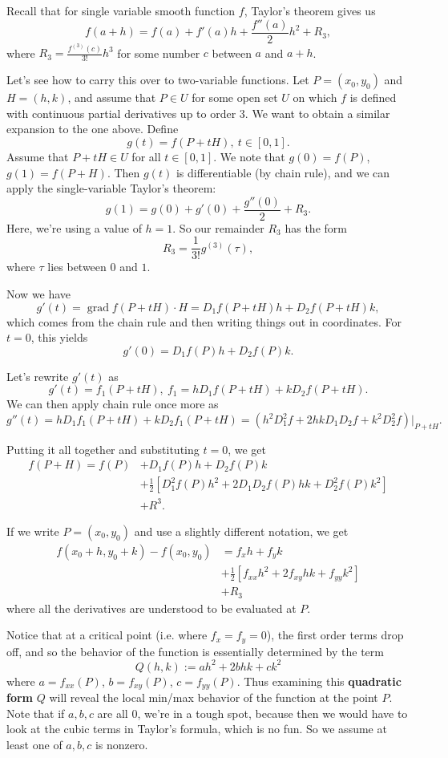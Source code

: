 \documentclass{article}
\DeclareMathOperator{\grd}{grad}
\begin{document}
Recall that for single variable smooth function $f$, Taylor's theorem gives us 
\[f(a+h) = f(a) + f'(a)h + \frac{f''(a)}{2} h^2 + R_3,\]
where $R_3 = \frac{f^{(3)}(c)}{3!}h^3$ for some number $c$ between $a$ and $a+h$.

Let's see how to carry this over to two-variable functions. Let $P=(x_0,y_0)$ and $H=(h,k)$, and assume
that $P \in U$ for some open set $U$ on which $f$ is defined with continuous partial derivatives up to order $3$.
We want to obtain a similar expansion to the one above. Define 
\[g(t) = f(P+tH),\ t \in [0,1].\]
Assume that $P+tH \in U$ for all $t \in [0,1]$. We note that $g(0) = f(P)$, $g(1) = f(P+H)$. 
Then $g(t)$ is differentiable (by chain rule), and we can apply the single-variable Taylor's theorem:
\[g(1) = g(0) + g'(0) + \frac{g''(0)}{2}+R_3.\]
Here, we're using a value of $h=1$. So our remainder $R_3$ has the form
\[R_3 = \frac{1}{3!} g^{(3)}(\tau),\]
where $\tau$ lies between $0$ and $1$.

Now we have
\[g'(t) = \grd f(P+tH)\cdot H = D_1 f(P+tH)h + D_2 f(P+tH)k,\]
which comes from the chain rule and then writing things out in coordinates.
For $t=0$, this yields
\[g'(0) = D_1 f(P) h + D_2 f(P)k.\]

Let's rewrite $g'(t)$ as 
\[g'(t) = f_1(P+tH),\ f_1 = hD_1 f(P+tH) + kD_2 f(P+tH).\]
We can then apply chain rule once more as 
\[g''(t) = hD_1f_1(P+tH) + kD_2f_1(P+tH)=\left( h^2 D_1^2 f + 2hkD_1 D_2 f + k^2 D_2^2 f \right)\bigg\vert_{P+tH}.\]

Putting it all together and substituting $t=0$, we get
\begin{align*}
    f(P+H)=f(P) &+ D_1f(P)h + D_2 f(P)k \\
    &+ \frac{1}{2}\left[ D_1^2 f(P)h^2 + 2D_1D_2f(P)hk + D_2^2 f(P) k^2\right]\\
    &+ R^3.
\end{align*}

If we write $P=(x_0,y_0)$ and use a slightly different notation, we get
\begin{align*}
    f(x_0+h,y_0+k) - f(x_0,y_0) &= f_{x}h + f_{y}k\\
    &+\frac{1}{2}\left[ f_{xx} h^2 + 2f_{xy}hk + f_{yy}k^2 \right]\\
    &+R_3
\end{align*}
where all the derivatives are understood to be evaluated at $P$.

Notice that at a critical point (i.e. where $f_x=f_y=0$), the 
first order terms drop off, and so the behavior of the function 
is essentially determined by the term
\[Q(h,k) := ah^2 + 2bhk + ck^2\]
where $a = f_{xx}(P)$, $b=f_{xy}(P)$, $c=f_{yy}(P)$.
Thus examining this \textbf{quadratic form} $Q$ will reveal the local min/max
behavior of the function at the point $P$. Note that if $a,b,c$ are
all $0$, we're in a tough spot, because then we would have to look at the
cubic terms in Taylor's formula, which is no fun. So we assume at 
least one of $a,b,c$ is nonzero.
\end{document}

